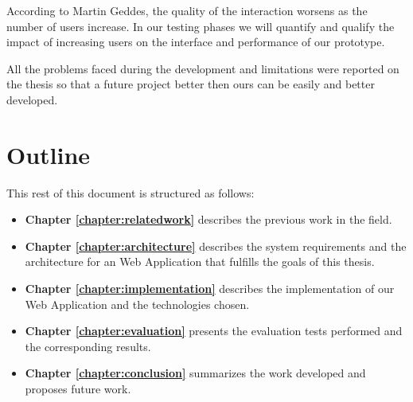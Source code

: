 	According to Martin Geddes, the quality of the interaction worsens as the number of users increase\cite{geddes}. In our testing phases we will quantify and qualify the impact of increasing users on the interface and performance of our prototype. 

	All the problems faced during the development and limitations were reported on the thesis so that a future project better then ours can be easily and better developed.


\section{Outline}

This rest of this document is structured as follows:

\begin{itemize}
\item \textbf{Chapter \ref{chapter:relatedwork}} describes the previous work in the field.
\item \textbf{Chapter \ref{chapter:architecture}} describes the system requirements and the architecture for an Web Application that fulfills the goals of this thesis.
\item \textbf{Chapter \ref{chapter:implementation}} describes the implementation of our Web Application and the technologies chosen.
\item \textbf{Chapter \ref{chapter:evaluation}} presents the evaluation tests performed and the corresponding results.
\item \textbf{Chapter \ref{chapter:conclusion}} summarizes the work developed and proposes future work.
\end{itemize}

\cleardoublepage
